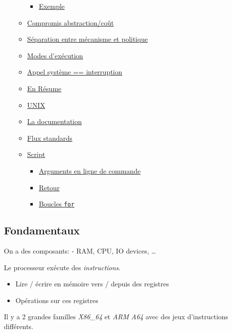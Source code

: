 \begin{itemize}
\begin{itemize}
    \begin{itemize}
    \tightlist
    \item
      \hyperref[exemple]{Exemple}
    \end{itemize}
  \item
    \hyperref[compromis-abstractioncouxfbt]{Compromis abstraction/coût}
  \item
    \hyperref[suxe9paration-entre-muxe9canisme-et-politique]{Séparation
    entre mécanisme et politique}
  \item
    \hyperref[modes-dexuxe9cution]{Modes d'exécution}
  \item
    \hyperref[appel-systuxe8me--interruption]{Appel système ==
    interruption}
  \item
    \hyperref[en-ruxe9sume]{En Résume}
  \item
    \hyperref[unix]{UNIX}
  \item
    \hyperref[la-documentation]{La documentation}
  \item
    \hyperref[flux-standards]{Flux standards}
  \item
    \hyperref[script]{Script}

    \begin{itemize}
    \tightlist
    \item
      \hyperref[arguments-en-ligne-de-commande]{Arguments en ligne de
      commande}
    \item
      \hyperref[retour]{Retour}
    \item
      \hyperref[boucles-for]{Boucles \texttt{for}}
    \end{itemize}
  \end{itemize}
\end{itemize}

\subsection{Fondamentaux}\label{fondamentaux}

On a des composants: - RAM, CPU, IO devices, \ldots{}

Le processeur exécute des \emph{instructions}.

\begin{itemize}
\tightlist
\item
  Lire / écrire en mémoire vers / depuis des registres
\item
  Opérations sur ces registres
\end{itemize}

Il y a 2 grandes familles \emph{X86\_64} et \emph{ARM A64} avec des jeux
d'instructions différents.


